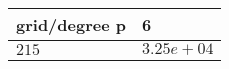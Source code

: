\begin{tabular}{ll}
\hline
 grid/degree p   & 6          \\
\hline
 $215$           & $3.25e+04$ \\
\hline
\end{tabular}